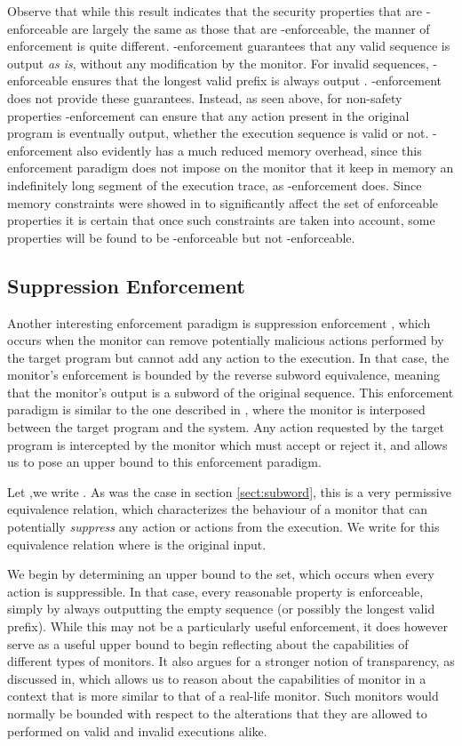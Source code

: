 \documentclass[12pt]{article}
\begin{document}
Observe that while this result indicates that the  security properties that are -enforceable are largely the same as those that are -enforceable, the manner of enforcement is quite different. -enforcement guarantees that  any valid sequence is output \textit{as is}, without any modification by the monitor. For invalid sequences, -enforceable ensures that the longest valid prefix is always output \cite{WhatMeanArt}.   -enforcement does not provide these guarantees. Instead, as seen above, for non-safety properties -enforcement can ensure that any action present in the original program is eventually output, whether the execution sequence is valid or not. -enforcement also evidently has a much reduced memory overhead, since this enforcement paradigm does not impose on the monitor that it keep in memory an indefinitely long segment of the execution trace, as -enforcement does. Since  memory constraints were showed in \cite{fong} to significantly affect the set of enforceable properties it is certain that once such constraints are taken into account, some properties will be found to be -enforceable but not -enforceable.

\subsection{Suppression Enforcement}

Another interesting enforcement paradigm is suppression enforcement \cite{MoreEnforce}, which occurs when the monitor can remove potentially malicious actions  performed by the target program but cannot add any action to the execution. In that case, the monitor's enforcement is bounded by the reverse subword equivalence, meaning that the monitor's output is a subword of the original sequence.  This enforcement paradigm is similar to the one described in \cite{runtimeResults}, where the monitor is interposed between the target program and the system. Any action requested by the target program is intercepted by the monitor which must accept or reject it, and allows us to pose an upper bound to this enforcement paradigm.

Let ,we write  . As was the case in section \ref{sect:subword}, this is a very permissive equivalence relation, which characterizes the behaviour of a monitor that can potentially \textit{suppress} any action or actions from the execution.  We write  for this equivalence relation where  is the original input.

We begin by determining an upper bound to the set, which occurs when every action is suppressible. In that case, every reasonable property is enforceable, simply by always outputting the empty sequence (or possibly the longest valid prefix). While this may not be a particularly useful enforcement, it does however serve as a useful upper bound to begin reflecting about the capabilities of different types of monitors. It also argues for a stronger notion of transparency, as discussed in\cite{KT2012}, which allows us to reason about the capabilities of monitor in a context that is more similar to that of a real-life monitor. Such monitors would normally be bounded with respect to the alterations that they are allowed to performed on valid and invalid executions alike.
\end{document}
